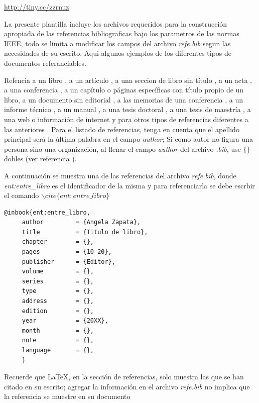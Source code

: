 \url{http://tiny.cc/zzrnuz}

La presente plantilla incluye los archivos requeridos para la construcción apropiada de las referencias bibliograficas bajo los parametros de las normas IEEE, todo se limita a modificar los campos del archivo \textit{refe.bib} segun las necesidades de su escrito. Aqui algunos ejemplos de los diferentes tipos de documentos referanciables.


Refencia a un libro \cite{lib:libro}, a un artículo \cite{art:baker}, a una seccion de libro sin título \cite{sec:pediatria}, a un acta \cite{act:acta}, a una conferencia \citep{con:conferencia}, a un capítulo o páginas específicas con título propio de un libro\citep[pp. 7-10]{ent:entre_libro},  a un documento sin editorial \citep{fll:folleto}, a las memorias de una conferencia \citep{ina:articulo_en_acta}, a un informe técnico \citep{inf:informe_tecnico}, a un manual \citep{man:manual}, a una tesis doctoral \citep{phd:phd_tesis}, a una tesis de maestría \citep{tes:tesis}, a una web o información de internet \citep{web:web} y para otros tipos de referencias diferentes a las anteriores \cite{opc:film}. Para el listado de referencias, tenga en cuenta que el apellido principal será la última palabra en el campo \textit{author}; Si como autor no figura una persona sino una organización, al llenar el campo \textit{author} del archivo \textit{.bib}, use $\{\}$ dobles (ver referencia \citep{lib:ieee}).

A continuación se muestra una de las referencias del archivo \textit{refe.bib}, donde \linebreak \textit{ent:entre\_libro} es el identificador de la misma y para referenciarla se debe escrbir el comando $\backslash cite\{ent:entre\_libro\}$ 

\newpage
\begin{verbatim}
@inbook{ent:entre_libro,
     author         = {Angela Zapata},
     title          = {Titulo de libro},
     chapter        = {},
     pages          = {10-20},
     publisher      = {Editor},
     volume         = {},
     series	        = {},
     type           = {},
     address        = {},
     edition        = {},
     year           = {20XX},
     month          = {},
     note           = {},
     language       = {},
     }
\end{verbatim}

Recuerde que \LaTeX , en la sección de referencias, solo muestra las que se han citado en su escrito; agregar la información en el archivo \textit{refe.bib} no implica que la referencia se muestre en su documento

